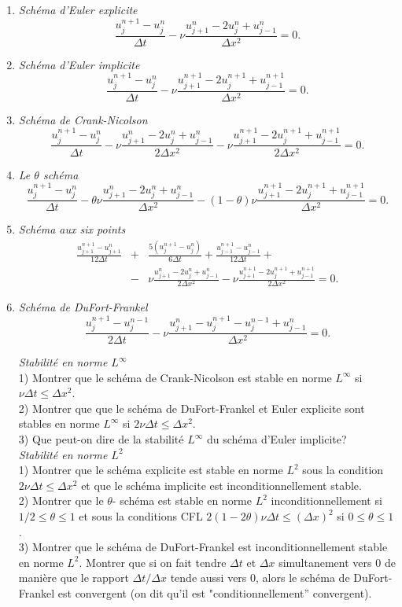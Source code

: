 \documentclass[12pt,a4paper]{article}
\begin{document}
\begin{enumerate}
\item {\it Sch\'ema d'Euler explicite}
$$
\frac{u_j^{n+1}-u_j^n}{\Delta t}-\nu \frac{u_{j+1}^{n}-2u_j^n+u_{j-1}^{n}}{\Delta x^2}=0.
$$

\item {\it Sch\'ema d'Euler implicite}
$$
\frac{u_j^{n+1}-u_j^n}{\Delta t}-\nu \frac{u_{j+1}^{n+1}-2u_j^{n+1}+u_{j-1}^{n+1}}{\Delta x^2}=0.
$$

\item {\it Sch\'ema de Crank-Nicolson}
$$
\frac{u_j^{n+1}-u_j^n}{\Delta t}-\nu \frac{u_{j+1}^{n}-2u_j^n+u_{j-1}^{n}}{2\Delta x^2}-\nu \frac{u_{j+1}^{n+1}-2u_j^{n+1}+u_{j-1}^{n+1}}{2\Delta x^2}=0.
$$

\item {\it Le $\theta$ sch\'ema}
$$
\frac{u_j^{n+1}-u_j^n}{\Delta t}-\theta\nu \frac{u_{j+1}^{n}-2u_j^n+u_{j-1}^{n}}{\Delta x^2}-(1-\theta)\nu \frac{u_{j+1}^{n+1}-2u_j^{n+1}+u_{j-1}^{n+1}}{\Delta x^2}=0.
$$

\item {\it Sch\'ema aux six points}
$$
\begin{array}{lcl}
\displaystyle\frac{u_{j+1}^{n+1}-u_{j+1}^n}{12\Delta t}& +& \displaystyle\frac{5(u_{j}^{n+1}-u_{j}^n)}{6\Delta t}+\frac{u_{j-1}^{n+1}-u_{j-1}^n}{12\Delta t}+\\[2ex]
& -&\displaystyle\nu \frac{u_{j+1}^{n}-2u_j^n+u_{j-1}^{n}}{2\Delta x^2}-\nu \frac{u_{j+1}^{n+1}-2u_j^{n+1}+u_{j-1}^{n+1}}{2\Delta x^2}=0.
\end{array}
$$

\item {\it Sch\'ema de DuFort-Frankel}
$$
\frac{u_j^{n+1}-u_j^{n-1}}{2\Delta t}-\nu \frac{u_{j+1}^{n}-u_j^{n+1}-u_j^{n-1}+u_{j-1}^{n}}{\Delta x^2}=0.
$$


{\it Stabilit\'e en norme $L^{\infty}$}\\
1) Montrer que le sch\'ema de Crank-Nicolson est stable en norme $L^{\infty}$ si $\nu\Delta t\le \Delta x^2$.\\
2) Montrer que que le sch\'ema de DuFort-Frankel et Euler explicite sont stables en norme $L^{\infty}$ si $2\nu\Delta t\le \Delta x^2$. \\
3) Que peut-on dire de la stabilit\'e $L^{\infty}$ du sch\'ema d'Euler
implicite?\\

{\it Stabilit\'e en norme $L^2$}\\
1) Montrer que le sch\'ema explicite est stable en norme $L^2$ sous la condition $2\nu\Delta t\le \Delta x^2$ et que le sch\'ema implicite est inconditionnellement stable.\\
2) Montrer que le $\theta$- sch\'ema est stable en norme $L^2$ inconditionnellement si $1/2\le \theta \le 1$ et sous la conditions CFL $2(1-2\theta)\nu\Delta t\le (\Delta x)^2$ si $0\le\theta\le 1$.\\
3) Montrer que le sch\'ema de DuFort-Frankel est inconditionnellement
stable en norme $L^2$. Montrer que si on fait tendre $\Delta t$ et
$\Delta x$ simultanement vers $0$ de mani\`ere que le rapport $\Delta
t/\Delta x$ tende aussi vers $0$, alors le sch\'ema de DuFort-Frankel
est convergent (on dit qu'il est "conditionnellement'' convergent).  


\end{enumerate}
\end{document}
